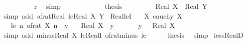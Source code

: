 \begin{isabellebody}
\ \ \ \ \ \ \ \ \isamarkupfalse%
\ r\ \isamarkupfalse%
\ simp\isanewline
\ \ \ \ \isamarkupfalse%
\isanewline
\ \ \ \ \isamarkupfalse%
\ \isamarkupfalse%
\ {\isacharquery}{\kern0pt}thesis\ \isacommand{{\isachardot}{\kern0pt}{\isachardot}{\kern0pt}}\isamarkupfalse%
\isanewline
\ \ \isamarkupfalse%
\isanewline
\ \ \isamarkupfalse%
\ \isamarkupfalse%
\ {\isachardoublequoteopen}Real\ X\ {\isasymle}\ Real\ Y{\isachardoublequoteclose}\isanewline
\ \ \ \ \isamarkupfalse%
\ {\isacharparenleft}{\kern0pt}simp\ add{\isacharcolon}{\kern0pt}\ of{\isacharunderscore}{\kern0pt}rat{\isacharunderscore}{\kern0pt}Real\ le{\isacharunderscore}{\kern0pt}Real\ X\ Y{\isacharparenright}{\kern0pt}\isanewline
{}\isamarkupfalse%
%
\endisatagproof
{\isafoldproof}%
%
\isadelimproof
\isanewline
%
\endisadelimproof
\isanewline
{}\isamarkupfalse%
\ Real{\isacharunderscore}{\kern0pt}leI{\isacharcolon}{\kern0pt}\isanewline
\ \ \ X{\isacharcolon}{\kern0pt}\ {\isachardoublequoteopen}cauchy\ X{\isachardoublequoteclose}\isanewline
\ \ \ le{\isacharcolon}{\kern0pt}\ {\isachardoublequoteopen}{\isasymforall}n{\isachardot}{\kern0pt}\ of{\isacharunderscore}{\kern0pt}rat\ {\isacharparenleft}{\kern0pt}X\ n{\isacharparenright}{\kern0pt}\ {\isasymle}\ y{\isachardoublequoteclose}\isanewline
\ \ \ {\isachardoublequoteopen}Real\ X\ {\isasymle}\ y{\isachardoublequoteclose}\isanewline
%
\isadelimproof
%
\endisadelimproof
%
\isatagproof
{}\isamarkupfalse%
\ {\isacharminus}{\kern0pt}\isanewline
\ \ \isamarkupfalse%
\ {\isachardoublequoteopen}{\isacharminus}{\kern0pt}\ y\ {\isasymle}\ {\isacharminus}{\kern0pt}\ Real\ X{\isachardoublequoteclose}\isanewline
\ \ \ \ \isamarkupfalse%
\ {\isacharparenleft}{\kern0pt}simp\ add{\isacharcolon}{\kern0pt}\ minus{\isacharunderscore}{\kern0pt}Real\ X\ le{\isacharunderscore}{\kern0pt}RealI\ of{\isacharunderscore}{\kern0pt}rat{\isacharunderscore}{\kern0pt}minus\ le{\isacharparenright}{\kern0pt}\isanewline
\ \ \isamarkupfalse%
\ \isamarkupfalse%
\ {\isacharquery}{\kern0pt}thesis\ \isamarkupfalse%
\ simp\isanewline
{}\isamarkupfalse%
%
\endisatagproof
{\isafoldproof}%
%
\isadelimproof
\isanewline
%
\endisadelimproof
\isanewline
{}\isamarkupfalse%
\ less{\isacharunderscore}{\kern0pt}RealD{\isacharcolon}{\kern0pt}\isanewline

\end{isabellebody}
